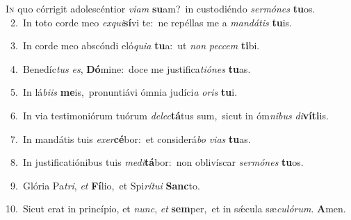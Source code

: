 \lettrine{\initial\textcolor{\initialcolor}{I}}{n} quo córrigit adolescéntior \textit{vi}\-\textit{am} \textbf{su}\-am?~\star in custodiéndo \textit{ser}\-\textit{mó}\textit{nes} \textbf{tu}\-os.\\
{\numbfont\textcolor{\numbcolor}{~2.}}~In toto corde meo \textit{ex}\-\textit{qui}\textbf{sí}vi te:~\star ne repéllas me a \textit{man}\-\textit{dá}\textit{tis} \textbf{tu}\-is.\par
{\numbfont\textcolor{\numbcolor}{~3.}}~In corde meo abscóndi eló\-\textit{qui}\-\textit{a} \textbf{tu}\-a:~\star ut \textit{non} \textit{pec}\-\textit{cem} \textbf{ti}\-bi.\par
{\numbfont\textcolor{\numbcolor}{~4.}}~Benedíc\textit{tus} \textit{es}\-, \textbf{Dó}\-mine:~\star doce me justifica\-\textit{ti}\-\textit{ó}\textit{nes} \textbf{tu}\-as.\par
{\numbfont\textcolor{\numbcolor}{~5.}}~In lá\-\textit{bi}\-\textit{is} \textbf{me}\-is,~\star pronuntiávi ómnia judíci\textit{a} \textit{o}\-\textit{ris} \textbf{tu}\-i.\par
{\numbfont\textcolor{\numbcolor}{~6.}}~In via testimoniórum tuórum \textit{de}\-\textit{lec}\textbf{tá}tus sum,~\star sicut in óm\-\textit{ni}\-\textit{bus} \textit{di}\-\textbf{ví}\textbf{ti}is.\par
{\numbfont\textcolor{\numbcolor}{~7.}}~In mandátis tuis \textit{ex}\-\textit{er}\textbf{cé}bor:~\star et considerá\textit{bo} \textit{vi}\-\textit{as} \textbf{tu}\-as.\par
{\numbfont\textcolor{\numbcolor}{~8.}}~In justificatiónibus tuis \textit{me}\-\textit{di}\textbf{tá}bor:~\star non oblivíscar \textit{ser}\-\textit{mó}\textit{nes} \textbf{tu}\-os.\par
{\numbfont\textcolor{\numbcolor}{~9.}}~Glória Pa\-\textit{tri}\-, \textit{et} \textbf{Fí}\-lio,~\star et Spi\-\textit{rí}\-\textit{tu}\textit{i} \textbf{Sanc}\-to.\par
{\numbfont\textcolor{\numbcolor}{10.}}~Sicut erat in princípio, et \textit{nunc}\-, \textit{et} \textbf{sem}\-per,~\star et in sǽcula sæ\-\textit{cu}\-\textit{ló}\textit{rum}. \textbf{A}\-men.\par
